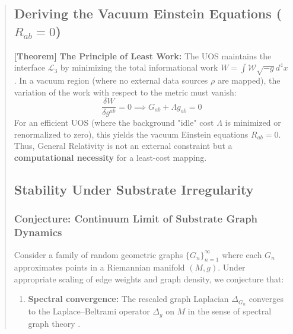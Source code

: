 \documentclass[11pt,titlepage]{article}
\newcommand{\interface}{\mathcal{L}_3}
\newcommand{\tagtheo}{\textcolor{green!60!black}{\textbf{[Theorem]}} }
\begin{document}
\begin{abstract}
\subsection{Deriving the Vacuum Einstein Equations (\texorpdfstring{$R_{ab}=0$}{Rab=0})}
\tagtheo \textbf{The Principle of Least Work:} The UOS maintains the interface $\interface$ by minimizing the total informational work $W = \int \mathcal{W} \sqrt{-g} d^4x$. In a vacuum region (where no external data sources $\rho$ are mapped), the variation of the work with respect to the metric must vanish:
\begin{equation}
\frac{\delta W}{\delta g^{ab}} = 0 \implies G_{ab} + \Lambda g_{ab} = 0
\end{equation}
For an efficient UOS (where the background "idle" cost $\Lambda$ is minimized or renormalized to zero), this yields the vacuum Einstein equations $R_{ab} = 0$. Thus, General Relativity is not an external constraint but a \textbf{computational necessity} for a least-cost mapping.

\subsection{Stability Under Substrate Irregularity}

\subsubsection{Conjecture: Continuum Limit of Substrate Graph Dynamics}
\label{conj:graph-continuum}

\begin{tcolorbox}[colback=yellow!5!white,colframe=yellow!75!black,title=Research Direction (Graph Continuum Limit)]
\label{conj:graph-limit}
Consider a family of random geometric graphs $\{G_n\}_{n=1}^\infty$ where each $G_n$ approximates points in a Riemannian manifold $(M,g)$. Under appropriate scaling of edge weights and graph density, we conjecture that:

\begin{enumerate}
\item \textbf{Spectral convergence:} The rescaled graph Laplacian $\Delta_{G_n}$ converges to the Laplace--Beltrami operator $\Delta_g$ on $M$ in the sense of spectral graph theory \cite{Chung1997}.


\end{enumerate}
\end{tcolorbox}
\end{abstract}
\end{document}
